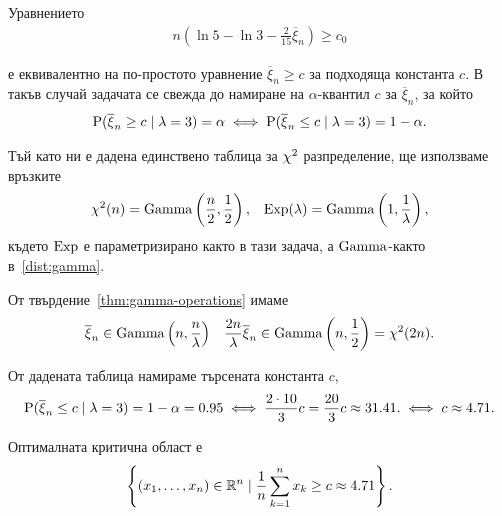 \documentclass[numbers=endperiod, bibliography=totocnumbered]{scrartcl}
\begin{document}
\begin{solution}
\begin{enumerate}[label=\alph*)]
    Уравнението
    \begin{align*}
      n \left(\ln 5 - \ln 3 - \frac 2 {15} \overline \xi_n \right) \geq c_0
    \end{align*}

    е еквивалентно на по-простото уравнение \( \overline \xi_n \geq c \) за подходяща константа \( c \). В такъв случай задачата се свежда до намиране на \( \alpha \)-квантил \( c \) за \( \overline \xi_n \), за който
    \begin{align*}
      \operatorname{P}(\overline \xi_n \geq c \mid \lambda = 3) = \alpha
      \iff
      \operatorname{P}(\overline \xi_n \leq c \mid \lambda = 3) = 1 - \alpha.
    \end{align*}

    Тъй като ни е дадена единствено таблица за \( \operatorname{\chi^2} \) разпределение, ще използваме връзките
    \begin{align*}
      \operatorname{\chi^2}(n) = \operatorname{Gamma} \left(\frac n 2, \frac 1 2 \right),
      &&
      \operatorname{Exp}(\lambda) = \operatorname{Gamma}\left(1, \frac 1 \lambda \right),
    \end{align*}
    където \( \operatorname{Exp} \) е параметризирано както в тази задача, а \( \operatorname{Gamma} \)-както в~\ref{dist:gamma}.

    От твърдение~\ref{thm:gamma-operations} имаме
    \begin{align*}
      \overline \xi_n \in \operatorname{Gamma}\left( n, \frac n \lambda \right)
      &&
      \frac {2n} \lambda \overline \xi_n \in \operatorname{Gamma}\left( n, \frac 1 2 \right) = \operatorname{\chi^2}(2n).
    \end{align*}

    От дадената таблица намираме търсената константа \( c \),
    \begin{align*}
      \operatorname{P}(\overline \xi_n \leq c \mid \lambda = 3) = 1 - \alpha = 0.95
      \iff
      \frac {2 \cdot 10} 3 c = \frac {20} 3 c \approx 31.41.
      \iff
      c \approx 4.71.
    \end{align*}

    Оптималната критична област е
    \begin{align*}
      \left \{ (x_1, \ldots, x_n) \in \mathbb{R}^n \mid \frac 1 n \sum_{k=1}^n x_k \geq c \approx 4.71 \right \}.
    \end{align*}
  \end{enumerate}
\end{solution}
\end{document}
